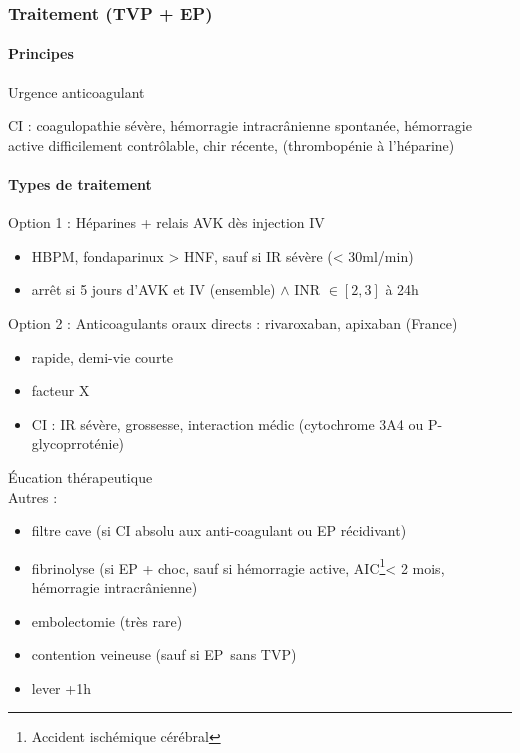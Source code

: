 \documentclass[11pt]{article}
\begin{document}
\subsubsection{Traitement (TVP + EP)}
\label{sec:org1044a96}
\paragraph{Principes}
\label{sec:orgb191cf7}
Urgence \faBomb \thus anticoagulant

CI : coagulopathie sévère, hémorragie intracrânienne spontanée, hémorragie
active difficilement contrôlable, chir récente, (thrombopénie à l'héparine)

\paragraph{Types de traitement}
\label{sec:orgfc5d354}
Option 1 : Héparines + relais AVK dès injection IV

\begin{itemize}
\item HBPM, fondaparinux > HNF, sauf si IR sévère (< 30ml/min)
\item arrêt si 5 jours d'AVK et IV (ensemble) \(\wedge\) INR \(\in [2,3]\) à 24h
\end{itemize}

Option 2 : Anticoagulants oraux directs : rivaroxaban, apixaban (France)

\begin{itemize}
\item rapide, demi-vie courte
\item facteur X
\item CI : IR sévère, grossesse, interaction médic (cytochrome 3A4 ou
P-glycoprroténie)
\end{itemize}

Éucation thérapeutique\\
Autres :

\begin{itemize}
\item filtre cave (si CI absolu aux anti-coagulant ou EP récidivant)
\item fibrinolyse (si EP + choc, sauf si hémorragie active,
AIC\footnote{Accident ischémique cérébral}< 2 mois,
hémorragie intracrânienne)
\item embolectomie (très rare)
\item contention veineuse (sauf si EP sans TVP)
\item lever +1h
\end{itemize}
\end{document}
